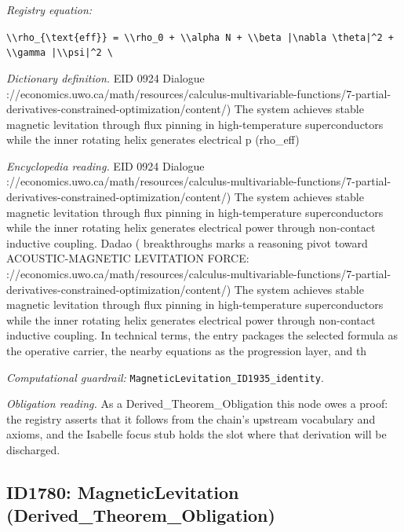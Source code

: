 \documentclass[11pt]{article}
\theoremstyle{remark}
\begin{document}
\noindent\textit{Registry equation:}\par
{\small\texttt{\textbackslash{}\textbackslash{}rho\_\{\textbackslash{}text\{eff\}\} = \textbackslash{}\textbackslash{}rho\_0 + \textbackslash{}\textbackslash{}alpha N + \textbackslash{}\textbackslash{}beta |\textbackslash{}nabla \textbackslash{}theta|\textasciicircum{}2 + \textbackslash{}\textbackslash{}gamma |\textbackslash{}\textbackslash{}psi|\textasciicircum{}2 \textbackslash{}}}\par\medskip
\noindent\textit{Dictionary definition.} EID 0924 Dialogue ://economics.uwo.ca/math/resources/calculus-multivariable-functions/7-partial-derivatives-constrained-optimization/content/) The system achieves stable magnetic levitation through flux pinning in high-temperature superconductors while the inner rotating helix generates electrical p (rho\_eff)\par\medskip
\noindent\textit{Encyclopedia reading.} EID 0924 Dialogue ://economics.uwo.ca/math/resources/calculus-multivariable-functions/7-partial-derivatives-constrained-optimization/content/) The system achieves stable magnetic levitation through flux pinning in high-temperature superconductors while the inner rotating helix generates electrical power through non-contact inductive coupling. Dadao ( breakthroughs marks a reasoning pivot toward ACOUSTIC-MAGNETIC LEVITATION FORCE: ://economics.uwo.ca/math/resources/calculus-multivariable-functions/7-partial-derivatives-constrained-optimization/content/) The system achieves stable magnetic levitation through flux pinning in high-temperature superconductors while the inner rotating helix generates electrical power through non-contact inductive coupling. In technical terms, the entry packages the selected formula as the operative carrier, the nearby equations as the progression layer, and th
\par\medskip\noindent\textit{Computational guardrail:} \texttt{MagneticLevitation\_ID1935\_identity}.
\par\medskip\noindent\textit{Obligation reading.} As a Derived\_Theorem\_Obligation this node owes a proof: the registry asserts that it follows from the chain's upstream vocabulary and axioms, and the Isabelle focus stub holds the slot where that derivation will be discharged.

\subsection{ID1780: MagneticLevitation (Derived\_Theorem\_Obligation)}
\end{document}
